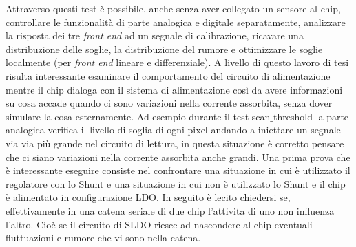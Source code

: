 Attraverso questi test è possibile, anche senza aver collegato un sensore al chip, controllare le funzionalità di parte analogica e digitale separatamente, analizzare la risposta dei tre \textit{front end} ad un segnale di calibrazione, ricavare una distribuzione delle soglie, la distribuzione del rumore e ottimizzare le soglie localmente (per \textit{front end} lineare e differenziale). 
A livello di questo lavoro di tesi risulta interessante esaminare il comportamento del circuito di alimentazione mentre il chip dialoga con il sistema di alimentazione così da avere informazioni su cosa accade quando ci sono variazioni nella corrente assorbita, senza dover simulare la cosa esternamente. 
Ad esempio durante il test scan$\_$threshold la parte analogica verifica il livello di soglia di ogni pixel andando a iniettare un segnale via via più grande nel circuito di lettura, in questa situazione è corretto pensare che ci siano variazioni nella corrente assorbita anche grandi. 
Una prima prova che è interessante eseguire consiste nel confrontare una situazione in cui è utilizzato il regolatore con lo Shunt e una situazione in cui non è utilizzato lo Shunt e il chip è alimentato in configurazione LDO. In seguito è lecito chiedersi se, effettivamente in una catena seriale di due chip l'attivita di uno non influenza l'altro. Cioè se il circuito di SLDO riesce ad nascondere al chip eventuali fluttuazioni e rumore  che vi sono nella catena.

